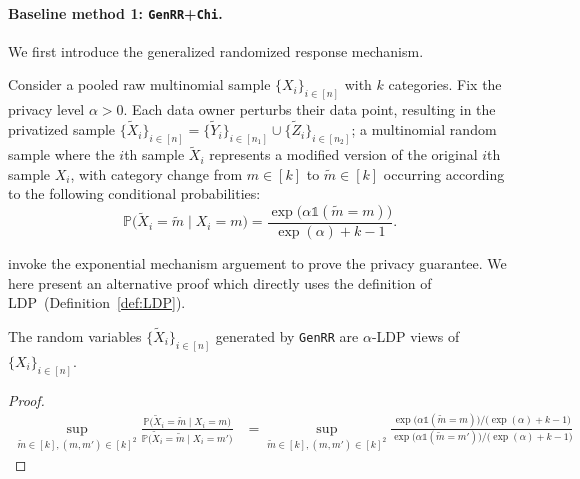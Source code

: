 \documentclass[twoside,11pt]{article}
\newcommand{\indicator}[1]{\mathds{1}\left( #1 \right) }%
\newcommand{\rvOne}{X}
\newcommand{\rvX}{X} %
\newcommand{\rvXPriv}{\tilde{\rvX}} %
\newcommand{\mP}{\mathbb{P}} %
\newcommand{\alphabetSize}{k} %
\newcommand{\privacyParameter}{\alpha} %
\begin{document}
\begin{appendix}
	\paragraph{Baseline method 1: \texttt{GenRR}+\texttt{Chi}.} We first  introduce the generalized randomized response mechanism.
	\begin{definition} \label{def:GenRR_formal}
		Consider a pooled raw multinomial sample $\{X_i\}_{i \in [n]}$ with $\alphabetSize$ categories. Fix the privacy level $\privacyParameter>0$.  Each data owner perturbs their data point, resulting in the privatized sample $\{\tilde{X}_{i}\}_{i \in [n]} = \{\tilde{Y}_i\}_{i\in [n_1]} \cup \{\tilde{Z}_i\}_{i \in [n_2]}$; a  multinomial random sample where the $i$th sample $\tilde{\rvOne}_{i}$ represents a modified version of the original $i$th sample $\rvOne_{i}$, with category change
		from $m \in [\alphabetSize]$ to $\tilde{m} \in [\alphabetSize]$
		occurring according to the following conditional probabilities:
		\begin{equation}\label{def:genrr}
			\mP
			\bigl(
			\tilde{\rvX}_{i} = \tilde{m}
			\;|\;
			\rvX_i = m
			\bigr)
			=
			\dfrac
			{\exp \bigl( \alpha \indicator{	\tilde{m} = m} \bigr) }
			{\exp(\alpha) + \alphabetSize - 1 }.
		\end{equation}
	\end{definition}
	\noindent
	\citet{Gaboardi2018LDPChisq} invoke the exponential mechanism arguement to prove the privacy guarantee. We here present an alternative proof which directly uses the definition of LDP~(Definition~\ref{def:LDP}).
	\begin{lemma}
		The random variables $\{\rvXPriv_{i}\}_{i \in [n]}$ generated by \textnormal{\texttt{GenRR}}  are $\privacyParameter$-LDP views of $\{X_i\}_{i \in [n]}$.
	\end{lemma}
	\begin{proof}
		\begin{align*}
			\sup_{\tilde{m} \in [k], (m, m')\in [k]^2}
			\frac{\mP
				\bigl(
				\tilde{\rvX}_{i} = \tilde{m}
				\;|\;
				\rvX_i = m
				\bigr)
			}{
				\mP
				\bigl(
				\tilde{\rvX}_{i} = \tilde{m}
				\;|\;
				\rvX_i = m'
				\bigr)
			}
			&=
			\sup_{\tilde{m} \in [k], (m, m')\in [k]^2}
			\frac{
				\exp \bigl( \alpha \indicator{	\tilde{m} = m} \bigr)
				/
				\bigl(  \exp(\alpha) + \alphabetSize - 1 \bigr) 
			}{
				\exp \bigl( \alpha \indicator{	\tilde{m} = m'} \bigr)
				/
				\bigl(  \exp(\alpha) + \alphabetSize - 1 \bigr)
}
\end{align*}
\end{proof}
\end{appendix}
\end{document}
